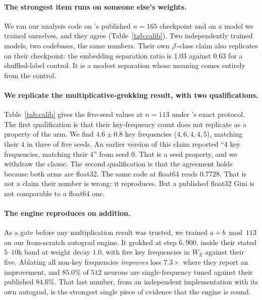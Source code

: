 \paragraph{The strongest item runs on someone else's weights.} We ran our analysis code on
\citet{chen2026multiplication}'s published $n = 165$ checkpoint and on a model we trained
ourselves, and they agree (Table~\ref{tab:calib}). Two independently trained models, two
codebases, the same numbers. Their own $\mathcal{J}$-class claim also replicates on their
checkpoint: the embedding separation ratio is $1.03$ against $0.63$ for a shuffled-label
control. It is a modest separation whose meaning comes entirely from the control.

\paragraph{We replicate the multiplicative-grokking result, with two qualifications.}
Table~\ref{tab:calib} gives the five-seed values at $n = 113$ under
\citet{nguyen2026dlogclock}'s exact protocol. The first qualification is that their
key-frequency count does not replicate as a property of the arm. We find $4.6 \pm 0.8$ key
frequencies ($4, 6, 4, 4, 5$), matching their $4$ in three of five seeds. An earlier version of
this claim reported ``$4$ key frequencies, matching their $4$'' from seed $0$. That is a seed
property, and we withdraw the clause. The second qualification is that the agreement holds
because both arms are float32. The same code at float64 reads $0.7728$. That is not a claim
their number is wrong: it reproduces. But a published float32 Gini is not comparable to a
float64 one.

\paragraph{The engine reproduces \citet{nanda2023progress} on addition.} As a gate before any
multiplication result was trusted, we trained $a + b \bmod 113$ on our from-scratch autograd
engine. It grokked at step $6{,}900$, inside their stated $5$--$10$k band at weight decay
$1.0$, with five key frequencies in $W_{E}$ against their five. Ablating all non-key
frequencies \emph{improves} loss $7.3\times$ where they report an improvement, and $85.0\%$ of
$512$ neurons are single-frequency tuned against their published $84.6\%$. That last number,
from an independent implementation with its own autograd, is the strongest single piece of
evidence that the engine is sound.

